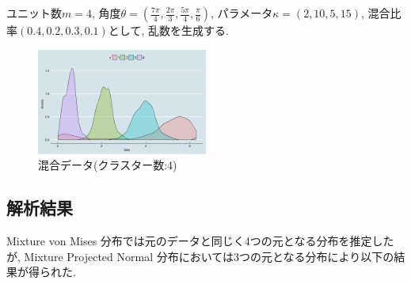 \documentclass[a4paper,11pt]{jarticle}
\begin{document}
ユニット数$m=4$, 角度$\theta = \left( \frac{7\pi}{4}, \frac{2\pi}{3}, \frac{5\pi}{4}, \frac{\pi}{6}\right)$, パラメータ$\kappa= (2,10,5,15)$, 混合比率$(0.4, 0.2, 0.3, 0.1)$として, 乱数を生成する. 

\vspace{-1zh}
\begin{figure}[H]
\begin{center}
\includegraphics[clip,height= 35mm]{data/mix_test_data.png}
\end{center}
\caption{混合データ(クラスター数:4)}

\label{mixdata}
\end{figure}

\subsection{解析結果}

Mixture von Mises 分布では元のデータと同じく4つの元となる分布を推定したが, Mixture Projected Normal 分布においては3つの元となる分布により以下の結果が得られた.
\end{document}
